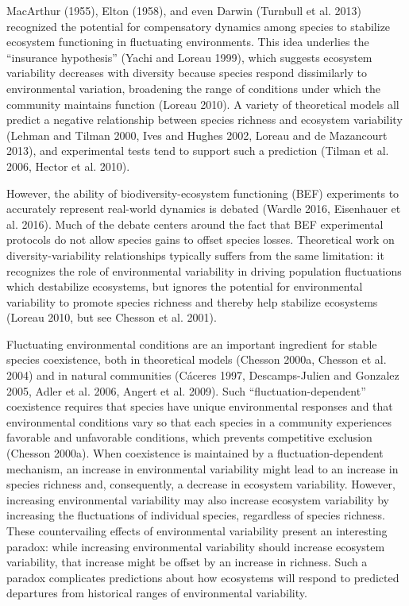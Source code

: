 \documentclass[12pt,]{article}
\begin{document}
MacArthur (1955), Elton (1958), and even Darwin (Turnbull et al. 2013)
recognized the potential for compensatory dynamics among species to
stabilize ecosystem functioning in fluctuating environments. This idea
underlies the ``insurance hypothesis'' (Yachi and Loreau 1999), which
suggests ecosystem variability decreases with diversity because species
respond dissimilarly to environmental variation, broadening the range of
conditions under which the community maintains function (Loreau 2010). A
variety of theoretical models all predict a negative relationship
between species richness and ecosystem variability (Lehman and Tilman
2000, Ives and Hughes 2002, Loreau and {{de Mazancourt}} 2013), and
experimental tests tend to support such a prediction (Tilman et al.
2006, Hector et al. 2010).

However, the ability of biodiversity-ecosystem functioning (BEF)
experiments to accurately represent real-world dynamics is debated
(Wardle 2016, Eisenhauer et al. 2016). Much of the debate centers around
the fact that BEF experimental protocols do not allow species gains to
offset species losses. Theoretical work on diversity-variability
relationships typically suffers from the same limitation: it recognizes
the role of environmental variability in driving population fluctuations
which destabilize ecosystems, but ignores the potential for
environmental variability to promote species richness and thereby help
stabilize ecosystems (Loreau 2010, but see Chesson et al. 2001).

Fluctuating environmental conditions are an important ingredient for
stable species coexistence, both in theoretical models (Chesson 2000a,
Chesson et al. 2004) and in natural communities (C{á}ceres 1997,
Descamps-Julien and Gonzalez 2005, Adler et al. 2006, Angert et al.
2009). Such ``fluctuation-dependent'' coexistence requires that species
have unique environmental responses and that environmental conditions
vary so that each species in a community experiences favorable and
unfavorable conditions, which prevents competitive exclusion (Chesson
2000a). When coexistence is maintained by a fluctuation-dependent
mechanism, an increase in environmental variability might lead to an
increase in species richness and, consequently, a decrease in ecosystem
variability. However, increasing environmental variability may also
increase ecosystem variability by increasing the fluctuations of
individual species, regardless of species richness. These countervailing
effects of environmental variability present an interesting paradox:
while increasing environmental variability should increase ecosystem
variability, that increase might be offset by an increase in richness.
Such a paradox complicates predictions about how ecosystems will respond
to predicted departures from historical ranges of environmental
variability.
\end{document}
